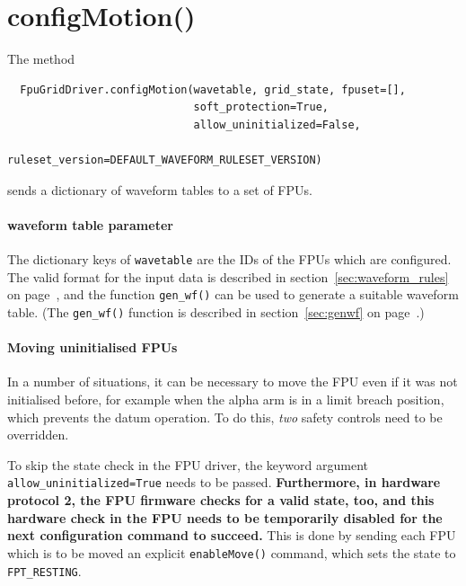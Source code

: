 \documentclass[fontsize=12,a4paper]{scrreprt}
\begin{document}
\minitoc


\section{configMotion()}
\label{sec:configmotion}
  The method
\begin{verbatim}
  FpuGridDriver.configMotion(wavetable, grid_state, fpuset=[],
                             soft_protection=True,
                             allow_uninitialized=False,
                             ruleset_version=DEFAULT_WAVEFORM_RULESET_VERSION)
\end{verbatim}
sends a dictionary of waveform tables to a set of FPUs.

\paragraph{waveform table parameter}

The dictionary keys of \texttt{wavetable} are the IDs of the FPUs
which are configured. The valid format for the input data is described
in section~\ref{sec:waveform_rules} on
page~\pageref{sec:waveform_rules}, and the function \texttt{gen\_wf()}
can be used to generate a suitable waveform table. (The
\texttt{gen\_wf()} function is described in section~\ref{sec:genwf} on
page~\pageref{sec:genwf}.)


\paragraph{Moving uninitialised FPUs}
\label{sec:moving_uninitialized_fpus}
    
 In a number of situations, it can be
necessary to move the FPU even if it was not initialised before, for
example when the alpha arm is in a limit breach position, which
prevents the datum operation. To do this, \emph{two} safety controls
need to be overridden.

To skip the state check in the FPU driver, the keyword argument
\texttt{allow\_uninitialized=True} needs to be
passed. \textbf{Furthermore, in hardware protocol 2, the FPU firmware
  checks for a valid state, too, and this hardware check in the FPU
  needs to be temporarily disabled for the next configuration command
  to succeed.} This is done by sending each FPU which is to be moved
an explicit \texttt{enableMove()} command, which sets the state to
\texttt{FPT\_RESTING}.
\end{document}
